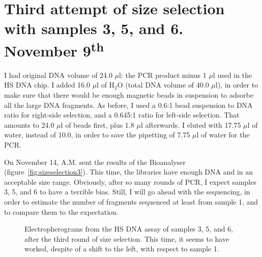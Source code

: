 \documentclass[a4paper,12pt]{article}
\begin{document}
\section{Third attempt of size selection with samples 3, 5, and 6. November 9\textsuperscript{th}}
I had original DNA volume of 24.0 $\mu$l: the PCR product minus 1 $\mu$l used in the HS DNA chip. I added 16.0 $\mu$l of H$_2$O (total DNA volume of 40.0 $\mu$l), in order to make sure that there would be enough magnetic beads in suspension to adsorbe all the large DNA fragments. As before, I used a 0.6:1 bead suspension to DNA ratio for right-side selection, and a 0.645:1 ratio for left-side selection. That amounts to 24.0 $\mu$l of beads first, plus 1.8 $\mu$l afterwards. I eluted with 17.75 $\mu$l of water, instead of 10.0, in order to save the pipetting of 7.75 $\mu$l of water for the PCR.

On November 14, A.M. sent the results of the Bioanalyser (figure~\ref{fig:sizeselection3}). This time, the libraries have enough DNA and in an acceptable size range. Obviously, after so many rounds of PCR, I expect samples 3, 5, and 6 to have a terrible bias. Still, I will go ahead with the sequencing, in order to estimate the number of fragments sequenced at least from sample 1, and to compare them to the expectation.

\begin{figure}
\caption{Electropherograms from the HS DNA assay of samples 3, 5, and 6, after the third round of size selection. This time, it seems to have worked, despite of a shift to the left, with respect to sample 1.}\label{fig:sizeselection2}
\end{figure}
\end{document}
